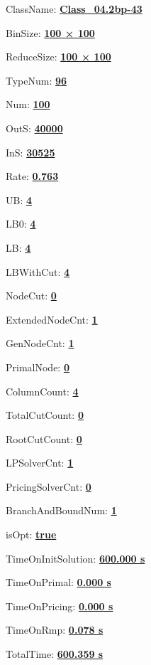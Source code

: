 \documentclass[11pt]{article}
\begin{document}
\pagestyle{empty}


ClassName: \underline{\textbf{Class_04.2bp-43}}
\par
BinSize: \underline{\textbf{100 × 100}}
\par
ReduceSize: \underline{\textbf{100 × 100}}
\par
TypeNum: \underline{\textbf{96}}
\par
Num: \underline{\textbf{100}}
\par
OutS: \underline{\textbf{40000}}
\par
InS: \underline{\textbf{30525}}
\par
Rate: \underline{\textbf{0.763}}
\par
UB: \underline{\textbf{4}}
\par
LB0: \underline{\textbf{4}}
\par
LB: \underline{\textbf{4}}
\par
LBWithCut: \underline{\textbf{4}}
\par
NodeCut: \underline{\textbf{0}}
\par
ExtendedNodeCnt: \underline{\textbf{1}}
\par
GenNodeCnt: \underline{\textbf{1}}
\par
PrimalNode: \underline{\textbf{0}}
\par
ColumnCount: \underline{\textbf{4}}
\par
TotalCutCount: \underline{\textbf{0}}
\par
RootCutCount: \underline{\textbf{0}}
\par
LPSolverCnt: \underline{\textbf{1}}
\par
PricingSolverCnt: \underline{\textbf{0}}
\par
BranchAndBoundNum: \underline{\textbf{1}}
\par
isOpt: \underline{\textbf{true}}
\par
TimeOnInitSolution: \underline{\textbf{600.000 s}}
\par
TimeOnPrimal: \underline{\textbf{0.000 s}}
\par
TimeOnPricing: \underline{\textbf{0.000 s}}
\par
TimeOnRmp: \underline{\textbf{0.078 s}}
\par
TotalTime: \underline{\textbf{600.359 s}}
\par
\newpage
\end{document}
